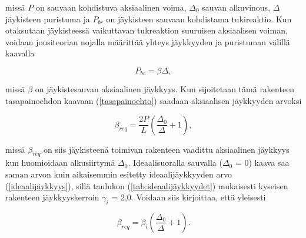 \documentclass[12pt]{article}
\newenvironment{content}{\pagenumbering{arabic}}{}
\begin{document}
\begin{content}
missä $P$ on sauvaan kohdistuva aksiaalinen voima, $\Delta_0$ sauvan alkuvinous, $\Delta$ jäykisteen puristuma ja $P_{br}$ on jäykisteen sauvaan kohdistama tukireaktio. Kun otaksutaan jäykisteessä vaikuttavan tukreaktion suuruisen aksiaalisen voiman, voidaan jousiteorian nojalla määrittää yhteys jäykkyyden ja puristuman välillä kaavalla

\begin{equation}
\label{jousiteoria}
P_{br} = \beta \Delta,
\end{equation}

missä $\beta$ on jäykistesauvan aksiaalinen jäykkyys. Kun sijoitetaan tämä rakenteen tasapainoehdon kaavaan (\ref{tasapainoehto}) saadaan aksiaalisen jäykkyyden arvoksi

\begin{equation}
\label{breq}
\beta_{req} = \frac{2 P}{L} (\frac{\Delta_0}{\Delta} + 1),
\end{equation}

missä $\beta_{req}$ on siis jäykisteenä toimivan rakenteen vaadittu aksiaalinen jäykkyys kun huomioidaan alkusiirtymä $\Delta_0$. Ideaalisuoralla sauvalla ($\Delta_0$ = 0) kaava saa saman arvon kuin aikaisemmin esitetty ideaalijäykkyyden arvo (\ref{ideaalijäykkyys}), sillä taulukon (\ref{tab:ideaalijäykkyydet}) mukaisesti kyseisen rakenteen jäykkyyskerroin $\gamma_i$ = 2,0. Voidaan siis kirjoittaa, että yleisesti

\begin{equation}
\label{breq_2}
\beta_{req} = \beta_i (\frac{\Delta_0}{\Delta} + 1).
\end{equation}







\end{content}
\end{document}

